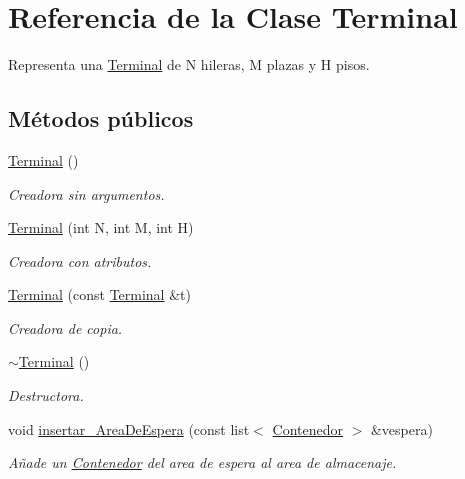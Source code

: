 \hypertarget{class_terminal}{}\section{Referencia de la Clase Terminal}
\label{class_terminal}


Representa una \hyperlink{class_terminal}{Terminal} de N hileras, M plazas y H pisos.  


\subsection*{Métodos públicos}
\begin{DoxyCompactItemize}
\item 
\hyperlink{class_terminal_aa448509b5aa1ece53c3d86385655be0e}{Terminal} ()
\begin{DoxyCompactList}\small\item\em Creadora sin argumentos. \end{DoxyCompactList}\item 
\hyperlink{class_terminal_a696ee89f0fc7359b528c9f8f2aec064f}{Terminal} (int N, int M, int H)
\begin{DoxyCompactList}\small\item\em Creadora con atributos. \end{DoxyCompactList}\item 
\hyperlink{class_terminal_a2502d3b03ed7f7f479b73e6575dedbf0}{Terminal} (const \hyperlink{class_terminal}{Terminal} \&t)
\begin{DoxyCompactList}\small\item\em Creadora de copia. \end{DoxyCompactList}\item 
\hyperlink{class_terminal_add5a7d4dd45b68af9a0afb1cc845af2f}{$\sim$\+Terminal} ()
\begin{DoxyCompactList}\small\item\em Destructora. \end{DoxyCompactList}\item 
void \hyperlink{class_terminal_a7b12f84e1eeb3dacb6d73f6126bb13e1}{insertar\+\_\+\+Area\+De\+Espera} (const list$<$ \hyperlink{class_contenedor}{Contenedor} $>$ \&vespera)
\begin{DoxyCompactList}\small\item\em Añade un \hyperlink{class_contenedor}{Contenedor} del area de espera al area de almacenaje. \end{DoxyCompactList}\item 

\end{DoxyCompactItemize}
